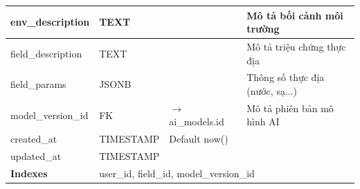 \documentclass[12pt,a4paper]{article}
\begin{document}
\begin{longtable}{|l|l|l|p{5.5cm}|}
    \hline
    env\_description     & TEXT                                                         &                                         & Mô tả bối cảnh môi trường       \\
    \hline
    field\_description   & TEXT                                                         &                                         & Mô tả triệu chứng thực địa      \\
    \hline
    field\_params        & JSONB                                                        &                                         & Thông số thực địa (nước, sạ...) \\
    \hline
    model\_version\_id   & FK                                                           & $\rightarrow$ ai\_models.id             & Mô tả phiên bản mô hình AI      \\
    \hline
    created\_at          & TIMESTAMP                                                    & Default now()                           &                                 \\
    \hline
    updated\_at          & TIMESTAMP                                                    &                                         &                                 \\
    \hline
    \rowcolor{headerblue}
    \textbf{Indexes}     & \multicolumn{3}{l|}{user\_id, field\_id, model\_version\_id}                                                                             \\
    \hline
\end{longtable}
\end{document}
